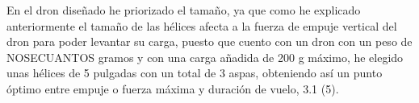  
 En el dron diseñado he priorizado el tamaño, ya que como he explicado anteriormente el tamaño de las hélices afecta a la fuerza de empuje vertical del dron para poder levantar su carga, puesto que cuento con un dron con un peso de NOSECUANTOS gramos y con una carga añadida de 200 g máximo, he elegido unas hélices de 5 pulgadas con un total de 3 aspas, obteniendo así un punto óptimo entre empuje o fuerza máxima y duración de vuelo, 3.1 (5).

